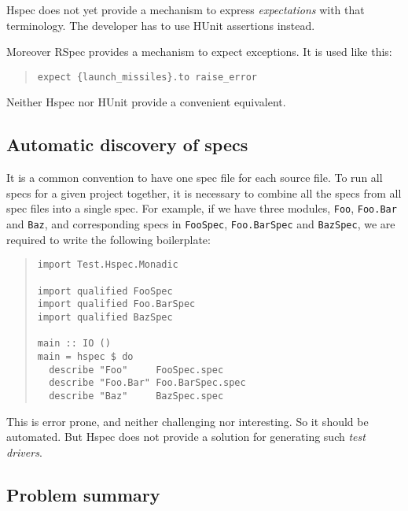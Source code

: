 \documentclass[preprint]{sigplanconf}
\begin{document}
\noindent Hspec does not yet provide a mechanism to express
\emph{expectations} with that terminology.  The developer has to use
HUnit assertions instead.

Moreover RSpec provides a mechanism to expect exceptions.  It is used
like this:

\begin{quote}
\small
\begin{verbatim}
expect {launch_missiles}.to raise_error
\end{verbatim}
\end{quote}

\noindent Neither Hspec nor HUnit provide a convenient equivalent.

\subsection{Automatic discovery of specs}
\label{sec:problem-discovery}

It is a common convention to have one spec file for each source file.
To run all specs for a given project together, it is necessary to
combine all the specs from all spec files into a single spec.  For
example, if we have three modules, \verb|Foo|, \verb|Foo.Bar| and
\verb|Baz|, and corresponding specs in \verb|FooSpec|,
\verb|Foo.BarSpec| and \verb|BazSpec|, we are required to write the
following boilerplate:

\begin{quote}
\small
\begin{verbatim}
import Test.Hspec.Monadic

import qualified FooSpec
import qualified Foo.BarSpec
import qualified BazSpec

main :: IO ()
main = hspec $ do
  describe "Foo"     FooSpec.spec
  describe "Foo.Bar" Foo.BarSpec.spec
  describe "Baz"     BazSpec.spec
\end{verbatim}
\end{quote}

\noindent This is error prone, and neither challenging nor
interesting.  So it should be automated.  But Hspec does not provide a
solution for generating such \emph{test drivers}.

\subsection{Problem summary}
\end{document}
